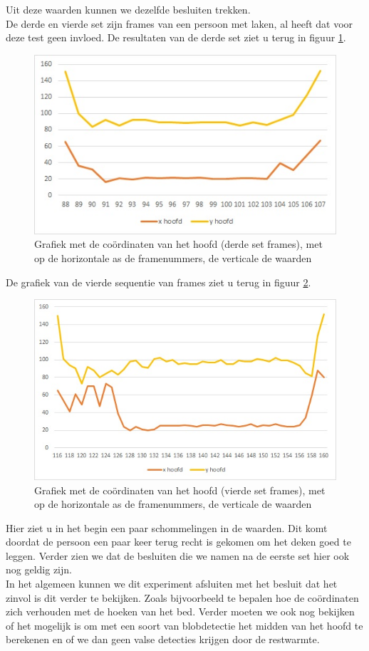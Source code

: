 Uit deze waarden kunnen we dezelfde besluiten trekken. \\
De derde en vierde set zijn frames van een persoon met laken, al heeft dat voor deze test geen invloed. De resultaten van de derde set ziet u terug in figuur \ref{imgCHM}. \\
\begin{figure}[hbp]
	\includegraphics[scale = 0.75]{Grafiek_UitBedM}
	\caption{Grafiek met de co\"ordinaten van het hoofd (derde set frames), met op de horizontale as de framenummers, de verticale de waarden}
	\label{imgCHM}
\end{figure}
De grafiek van de vierde sequentie van frames ziet u terug in figuur \ref{imgCHMT}.
\begin{figure}[hbp]
	\includegraphics[scale = 0.75]{Grafiek_UitBedMT}
	\caption{Grafiek met de co\"ordinaten van het hoofd (vierde set frames), met op de horizontale as de framenummers, de verticale de waarden}
	\label{imgCHMT}
\end{figure}
Hier ziet u in het begin een paar schommelingen in de waarden. Dit komt doordat de persoon een paar keer terug recht is gekomen om het deken goed te leggen. Verder zien we dat de besluiten die we namen na de eerste set hier ook nog geldig zijn.\\
In het algemeen kunnen we dit experiment afsluiten met het besluit dat het zinvol is dit verder te bekijken. Zoals bijvoorbeeld te bepalen hoe de co\"ordinaten zich verhouden met de hoeken van het bed. Verder moeten we ook nog bekijken of het mogelijk is om met een soort van blobdetectie het midden van het hoofd te berekenen en of we dan geen valse detecties krijgen door de restwarmte.

